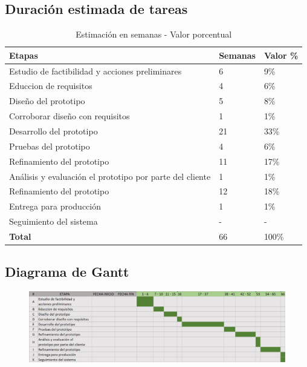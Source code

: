     \subsection{Duración estimada de tareas} 
      \begin{table}[H]
        \centering
        \begin{tabular}{|l|l|l|}
          \hline
          \centering
          Etapas  & Semanas  & Valor \% \\ \hline
          Estudio de factibilidad y acciones preliminares & 6 & 9\% \\ \hline
          Educcion de requisitos & 4 & 6\% \\ \hline
          Diseño del prototipo & 5 & 8\% \\ \hline
          Corroborar diseño con requisitos & 1 & 1\% \\ \hline
          Desarrollo del prototipo & 21 & 33\% \\ \hline
          Pruebas del prototipo & 4 & 6\% \\ \hline
          Refinamiento del prototipo & 11 & 17\% \\ \hline
          Análisis y evaluación el prototipo por parte del cliente & 1 & 1\% \\ \hline
          Refinamiento del prototipo & 12 & 18\% \\ \hline
          Entrega para producción & 1 & 1\% \\ \hline
          Seguimiento del sistema & - & - \\ \hline
          \textbf{Total} & 66 & 100\% \\ \hline
        \end{tabular}
        \caption {Estimación en semanas - Valor porcentual}
      \end{table}

    \subsection{Diagrama de Gantt} 

    \begin{figure}[htbp]
      \centering
        \includegraphics[width=1\textwidth]{imagenes/Grantt.jpg}
    \end{figure} 